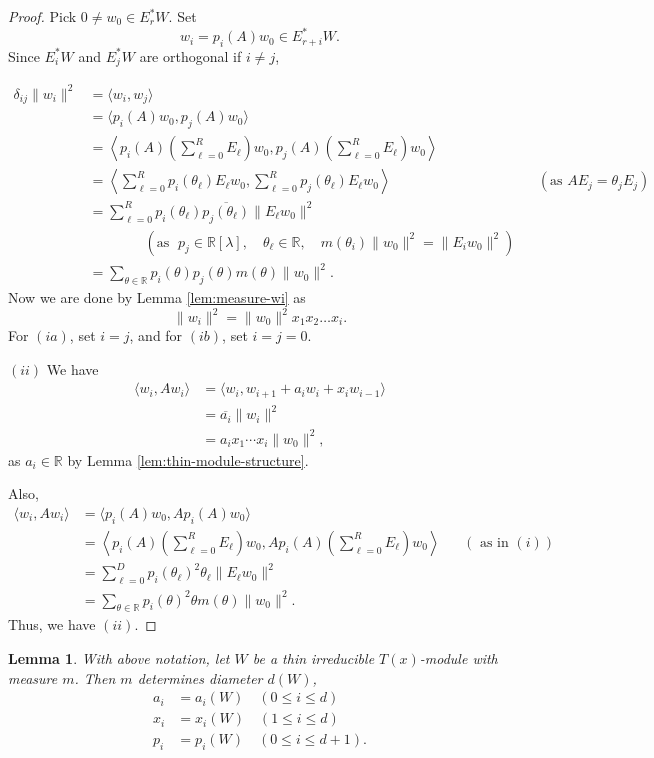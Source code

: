 \documentclass[
]{book}
\newtheorem{lemma}{Lemma}[chapter]
\theoremstyle{definition}
\theoremstyle{definition}
\theoremstyle{definition}
\theoremstyle{definition}
\theoremstyle{remark}
\begin{document}
\begin{proof}
Pick \(0\neq w_0\in E^*_rW\). Set
\[w_i = p_i(A)w_0 \in E^*_{r+i}W.\]
Since \(E^*_iW\) and \(E^*_jW\) are orthogonal if \(i\neq j\),

\begin{align}
\delta_{ij}\|w_i\|^2 & = \langle w_i, w_j\rangle\\
& = \langle p_i(A)w_0, p_j(A)w_0\rangle\\
& = \left\langle p_i(A)\left(\sum_{\ell=0}^R E_\ell\right)w_0, p_j(A)\left(\sum_{\ell=0}^R E_\ell\right)w_0\right\rangle\\
& = \left\langle \sum_{\ell=0}^R p_i(\theta_\ell)E_\ell w_0, \sum_{\ell=0}^R p_j(\theta_\ell)E_\ell w_0\right\rangle && (\text{as } AE_j = \theta_jE_j)\\
& = \sum_{\ell=0}^R p_i(\theta_\ell)\overline{p_j(\theta_\ell)}\|E_\ell w_0\|^2\\
& \qquad\qquad (\text{as } \; p_j\in \mathbb{R}[\lambda], \quad
\theta_\ell\in \mathbb{R}, \quad m(\theta_i)\|w_0\|^2 = \|E_iw_0\|^2)\\
& = \sum_{\theta\in \mathbb{R}} p_i(\theta)p_j(\theta)m(\theta)\|w_0\|^2.
\end{align}
Now we are done by Lemma \ref{lem:measure-wi} as
\[\|w_i\|^2 = \|w_0\|^2 x_1x_2\ldots x_i.\]
For \((ia)\), set \(i = j\), and for \((ib)\), set \(i=j=0\).

\((ii)\) We have
\begin{align}
\langle w_i,Aw_i\rangle & = \langle w_i, w_{i+1} + a_iw_i + x_i w_{i-1}\rangle\\
& = \overline{a_i}\|w_i\|^2\\
& = a_i x_1\cdots x_i\|w_0\|^2, 
\end{align}
as \(a_i\in \mathbb{R}\) by Lemma \ref{lem:thin-module-structure}.

Also,
\begin{align}
\langle w_i, Aw_i\rangle & = \langle p_i(A)w_0, Ap_i(A)w_0\rangle \\
& = \left\langle p_i(A)\left(\sum_{\ell=0}^R E_\ell\right)w_0, A p_i(A)\left(\sum_{\ell=0}^R E_\ell\right)w_0\right\rangle && (\text{ as in $(i)$})\\
& = \sum_{\ell = 0}^D p_i(\theta_\ell)^2 \theta_\ell \|E_\ell w_0\|^2\\
& = \sum_{\theta\in \mathbb{R}}p_i(\theta)^2\theta m(\theta)\|w_0\|^2.
\end{align}
Thus, we have \((ii)\).
\end{proof}

\begin{lemma}
\protect\hypertarget{lem:determined-by-m}{}\label{lem:determined-by-m}With above notation, let
\(W\) be a thin irreducible \(T(x)\)-module with measure \(m\). Then \(m\) determines diameter \(d(W)\),
\begin{align}
a_i & = a_i(W) \quad (0\leq i\leq d)\\
x_i & = x_i(W) \quad (1\leq i\leq d)\\
p_i & = p_i(W) \quad (0\leq i\leq d+1).
\end{align}
\end{lemma}
\end{document}
